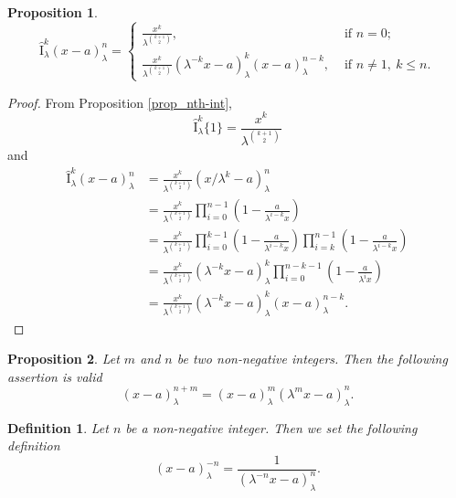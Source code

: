 \documentclass[12pt]{article}
\newcommand{\I}{\widehat{\mathrm{I}}}
\newtheorem{definition}{Definition}
\newtheorem{proposition}{Proposition}
\begin{document}
\begin{proposition}
    \begin{equation}
        \I_{\lambda}^{k}(x-a)_{\lambda}^n=
        \begin{cases}
            \frac{x^k}{\lambda^{\binom{k+1}{2}}},&\text{ if }n=0;\\
            \frac{x^k}{\lambda^{\binom{k+1}{2}}}(\lambda^{-k}x-a)_{\lambda}^{k}(x-a)_{\lambda}^{n-k},&\text{ if }n\neq1,\ k\leq n.
        \end{cases}
    \end{equation}
\end{proposition}
\begin{proof}
From Proposition \ref{prop_nth-int},
\begin{equation*}
   \I_{\lambda}^{k}\{1\}=\frac{x^k}{\lambda^{\binom{k+1}{2}}} 
\end{equation*}
and
\begin{align*}
    \I_{\lambda}^{k}(x-a)_{\lambda}^n&=\frac{x^k}{\lambda^{\binom{k+1}{2}}}(x/\lambda^k-a)_{\lambda}^n\\
    &=\frac{x^k}{\lambda^{\binom{k+1}{2}}}\prod_{i=0}^{n-1}\left(1-\frac{a}{\lambda^{i-k}x}\right)\\
    &=\frac{x^k}{\lambda^{\binom{k+1}{2}}}\prod_{i=0}^{k-1}\left(1-\frac{a}{\lambda^{i-k}x}\right)\prod_{i=k}^{n-1}\left(1-\frac{a}{\lambda^{i-k}x}\right)\\
    &=\frac{x^k}{\lambda^{\binom{k+1}{2}}}(\lambda^{-k}x-a)_{\lambda}^{k}\prod_{i=0}^{n-k-1}\left(1-\frac{a}{\lambda^{i}x}\right)\\
    &=\frac{x^k}{\lambda^{\binom{k+1}{2}}}(\lambda^{-k}x-a)_{\lambda}^{k}(x-a)_{\lambda}^{n-k}.
\end{align*}
\end{proof}

\begin{proposition}
Let $m$ and $n$ be two non-negative integers. Then the following assertion is valid
    \begin{equation}
        (x-a)_{\lambda}^{n+m}=(x-a)_{\lambda}^{m}(\lambda^mx-a)_{\lambda}^n.
    \end{equation}
\end{proposition}

\begin{definition}
Let $n$ be a non-negative integer. Then we set the following definition
    \begin{equation}
        (x-a)_{\lambda}^{-n}=\frac{1}{(\lambda^{-n}x-a)_{\lambda}^{n}}.
    \end{equation}
\end{definition}
\end{document}
